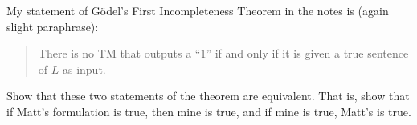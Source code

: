 \documentclass[12pt,a4paper]{article}
\begin{document}
\begin{enumerate}
My statement of G\"odel's First Incompleteness Theorem in the notes is (again slight paraphrase):
\begin{quote}
There is no TM that outputs a ``$1$'' if and only if it is given a true sentence of $L$ as input.
\end{quote}

Show that these two statements of the theorem are equivalent. That is, show that if Matt's formulation is true, then mine is true, and if mine is true, Matt's is true.

\end{enumerate}
\end{document}
